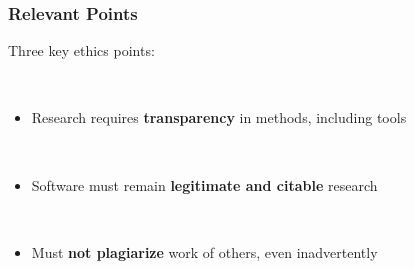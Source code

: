 \documentclass{beamer}
\begin{document}
\begin{frame}
\begin{center}
\frametitle{Relevant Points}

Three key ethics points:

~\\

\begin{itemize}

\item Research requires \textbf{transparency} in methods, including tools

~\\

\item Software must remain \textbf{legitimate and citable} research

~\\

\item Must \textbf{not plagiarize} work of others, even inadvertently

\end{itemize}

~\\

~\\


\end{center}
\end{frame}

\end{document}
